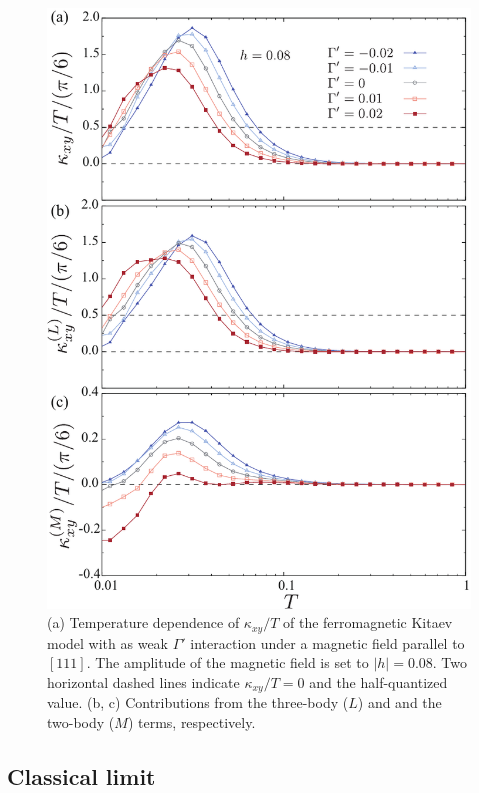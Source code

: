 \documentclass[reprint,amsmath,amssymb,aps,prx]{revtex4-2}
\begin{document}
\begin{figure}
  \begin{center}
    \includegraphics[width=0.9\linewidth]{plot_k_all_h0.08_Gp.pdf}
  \end{center}
  \caption{(a) Temperature dependence of $\kappa_{xy}/T$ of the ferromagnetic Kitaev model with as weak $\Gamma'$ interaction under a magnetic field parallel to $[111]$. The amplitude of the magnetic field is set to $|h|=0.08$. Two horizontal dashed lines indicate $\kappa_{xy}/T = 0$ and the half-quantized value. (b, c) Contributions from the three-body ($L$) and and the two-body ($M$) terms, respectively.}
  \label{fig:k_all_h0.08_Gp}
\end{figure}
  \subsection{Classical limit}
\end{document}
